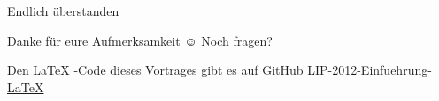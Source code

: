\begin{frame}[plain]{Endlich überstanden}
 \begin{block}{Danke für eure Aufmerksamkeit $\smiley $}
 \huge Noch fragen?
 \end{block}
 Den \LaTeX{ }-Code dieses Vortrages gibt es auf GitHub 
{ \color{blue} \href{https://github.com/P1tt187/LIP-2012-Einfuehrung-LaTeX}{LIP-2012-Einfuehrung-\LaTeX} }
\end{frame}
